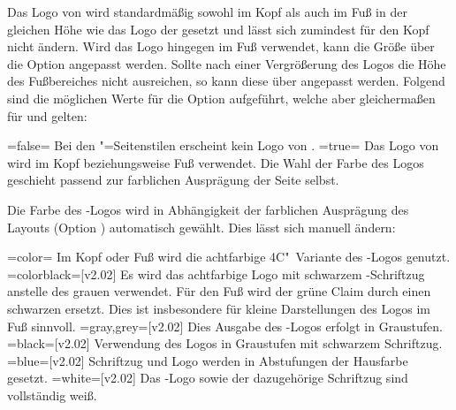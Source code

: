 \begin{DeclareEntity*}{}
\begin{DeclareEntity*}{}
\begin{DeclareEntity*}{}
\begin{Declaration}
\begin{Declaration}
\begin{Declaration}
Das Logo von \DDC wird standardmäßig sowohl im Kopf als auch im Fuß in der 
gleichen Höhe wie das Logo der \TnUD gesetzt und lässt sich zumindest für den 
Kopf nicht ändern. Wird das Logo hingegen im Fuß verwendet, kann die Größe über 
die Option  angepasst werden. Sollte nach einer 
Vergrößerung des Logos die Höhe des Fußbereiches nicht ausreichen, so kann 
diese über  angepasst werden. Folgend sind 
die möglichen Werte für die Option  aufgeführt, welche aber 
gleichermaßen für  und  gelten:
\begin{DeclareValues}
\itemval=false=
  Bei den "=Seitenstilen erscheint kein Logo von \DDC.
\itemval*=true=
  Das Logo von \DDC wird im Kopf beziehungsweise Fuß verwendet. Die Wahl der 
  Farbe des Logos geschieht passend zur farblichen Ausprägung der Seite selbst.
\end{DeclareValues}

Die Farbe des \DDC-Logos wird in Abhängigkeit der farblichen Ausprägung des 
Layouts (Option ) automatisch gewählt. Dies lässt sich 
manuell ändern:
\begin{DeclareValues}
\itemval=color=
  Im Kopf oder Fuß wird die achtfarbige 4C"~Variante des \DDC-Logos genutzt.
\itemval=colorblack=[v2.02]
  Es wird das achtfarbige Logo mit schwarzem \DDC-Schriftzug anstelle des 
  grauen verwendet. Für den Fuß wird der grüne Claim durch einen schwarzen 
  ersetzt. Dies ist insbesondere für kleine Darstellungen des Logos im Fuß 
  sinnvoll.
\itemval=gray,grey=[v2.02]
  Dies Ausgabe des \DDC-Logos erfolgt in Graustufen.
\itemval=black=[v2.02]
  Verwendung des Logos in Graustufen mit schwarzem Schriftzug.
\itemval=blue=[v2.02]
  Schriftzug und Logo werden in Abstufungen der Hausfarbe  gesetzt.
\itemval=white=[v2.02]
  Das \DDC-Logo sowie der dazugehörige Schriftzug sind vollständig weiß.
\end{DeclareValues}
%
\end{Declaration}
\end{Declaration}
\end{Declaration}


\end{DeclareEntity*}
\end{DeclareEntity*}
\end{DeclareEntity*}
